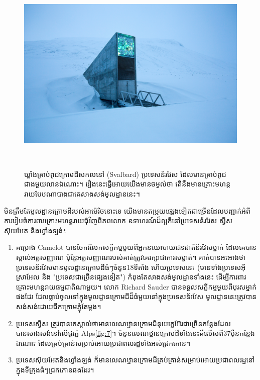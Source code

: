 \documentclass[10pt,twocolumn,letterpaper]{article}
\begin{document}
\begin{figure}[t]
\begin{center}
   \includegraphics[width=1\linewidth]{svalbard.jpg}
\end{center}
   \caption{ឃ្លាំងគ្រាប់ពូជក្រោមដីសកលនៅ (Svalbard) ប្រទេសន័រវែស ដែលមានគ្រាប់ពូជជាងមួយលានឯណោះ\cite{24}។ រឿងនេះធ្វើអោយយើងមានចម្ងល់ថា តើនឹងមានគ្រោះមហន្តរាយបែបណាបាងជាគេសាងសង់មូលដ្ឋាននេះ។}​
\label{fig:8}
\label{fig:onecol}
\end{figure}

	មិនត្រឹមតែមូលដ្ឋានក្រោមដីរបស់អាម៉េរិចនោះទេ យើងមានតម្រុយផ្សេងទៀតជាច្រើនដែលបញ្ជាក់អំពីការរៀបចំការពារគ្រោះមហន្តរាយជុំវិញពិភពលោក ឧទាហរណ៍​ដ៏ល្អគឺនៅប្រទេសន័រវែស ស្វីស ស៊ុយអែត និងហ្វាំងឡង់៖

\begin{flushleft}
\begin{enumerate}
    \item គម្រោង Camelot បានចែករំលែកសក្ខីកម្មមួយពីអ្នកនយោបាយជនជាតិន័រវែសម្នាក់\cite{25,26} ដែលគេបានស្គាល់អត្តសញ្ញាណ ប៉ុន្តែអត្តសញ្ញាណរបស់គាត់ត្រូវគេរក្សាជាការសម្ងាត់។ គាត់បានអះអាងថាប្រទេសន័រវែសមានមូលដ្ឋានក្រោមដីធំៗចំនួន18ទីតាំង ហើយប្រទេសនេះ (មានទាំងប្រទេសអុីស្រាអែល និង "ប្រទេសជាច្រើនផ្សេងទៀត") កំពុងតែសាងសង់មូលដ្ឋានទាំងនេះ ដើម្បីការពារគ្រោះមហន្តរាយធម្មជាតិណាមួយ។ លោក Richard Sauder បានទទួលសក្ខីកម្មមួយពីបុរសម្នាក់ផងដែរ ដែលធ្លាប់ចូលទៅក្នុងមូលដ្ឋានក្រោមដីដ៏ធំមួយនៅក្នុងប្រទេសន័រវែស មូលដ្ឋាននេះត្រូវបានសង់សង់ដោយជីកក្រោមភ្នុំតែម្តង\cite{22}។ 
    \item ប្រទេសស្វីស ត្រូវបានគេស្គាល់ថាមានលេណឋ្ឋានក្រោមដីនុយក្លេអ៊ែរជាច្រើនកន្លែងដែលបានសាងសង់នៅលើជួរភ្នំ Alps\ref{fig:7}។ ចំនួនលេណឋ្ឋានក្រោមដីទាំងនេះគឺលើសពី37មុឺនកន្លែងឯណោះ ដែលគ្រប់គ្រាន់សម្រាប់អោយប្រជាពលរដ្ឋទាំងអស់ជ្រកកោន\cite{27}។
    \item ប្រទេសស៊ុយអែតនិងហ្វាំងឡង់ ក៏មានលេណឋ្ឋានក្រោមដីគ្រប់គ្រាន់សម្រាប់អោយប្រជាពលរដ្ឋនៅក្នុងទីក្រុងធំៗជ្រកកោនផងដែរ\cite{27}។
\end{enumerate}
\end{flushleft}
\end{document}
